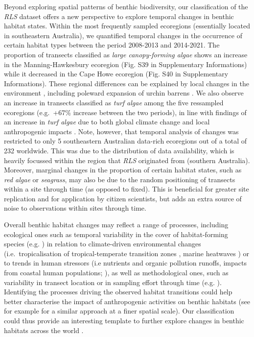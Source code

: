 \begin{refsection}
Beyond exploring spatial patterns of benthic biodiversity, our
classification of the \emph{RLS} dataset offers a new perspective to
explore temporal changes in benthic habitat states. Within the most
frequently sampled ecoregions (essentially located in southeastern
Australia), we quantified temporal changes in the occurrence of certain
habitat types between the period 2008-2013 and 2014-2021. The proportion
of transects classified as \emph{large canopy-forming algae} shows an
increase in the Manning-Hawkesbury ecoregion (Fig. S39 in Supplementary
Informations) while it decreased in the Cape Howe ecoregion (Fig. S40 in
Supplementary Informations). These regional differences can be explained
by local changes in the environment \autocite{Krumhansl_2016}, including
poleward expansion of urchin barrens \autocite{Ling_2018}. We also
observe an increase in transects classified as \emph{turf algae} among
the five ressampled ecoregions (e.g.~+67\% increase between the two
periods), in line with findings of an increase in \emph{turf algae} due
to both global climate change and local anthropogenic impacts
\autocite{Filbee-Dexter_2018}. Note, however, that temporal analysis of
changes was restricted to only 5 southeastern Australian data-rich
ecoregions out of a total of 232 worldwide. This was due to the
distribution of data availability, which is heavily focussed within the
region that \emph{RLS} originated from (southern Australia). Moreover,
marginal changes in the proportion of certain habitat states, such as
\emph{red algae} or \emph{seagrass}, may also be due to the random
positioning of transects within a site through time (as opposed to
fixed). This is beneficial for greater site replication and for
application by citizen scientists, but adds an extra source of noise to
observations within sites through time.

Overall benthic habitat changes may reflect a range of processes,
including ecological ones such as temporal variability in the cover of
habitat-forming species (e.g. \textcite{Wernberg_2016}) in relation to
climate-driven environmental changes (i.e.~tropicalisation of
tropical-temperate transition zones \autocite{Horta_2014}, marine
heatwaves \autocite{Wernberg_2016}) or to trends in human stressors (i.e
nutrients and organic pollution runoffs, impacts from coastal human
populations; \textcite{Halpern_2019}), as well as methodological ones,
such as variability in transect location or in sampling effort through
time (e.g. \textcite{Stuble_2021}). Identifying the processes driving
the observed habitat transitions could help better characterise the
impact of anthropogenic activities on benthic habitats (see for example
\textcite{Donovan_2018} for a similar approach at a finer spatial
scale). Our classification could thus provide an interesting template to
further explore changes in benthic habitats across the world
\autocite{Edgar_2023}.


\end{refsection}

